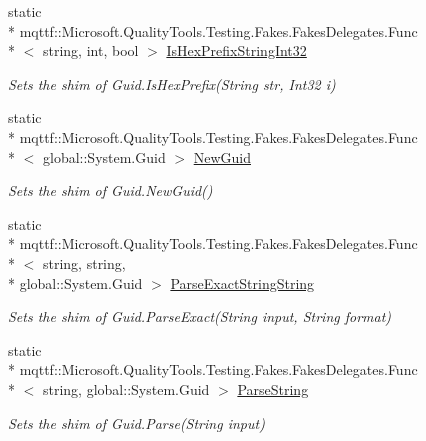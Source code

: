 \begin{DoxyCompactItemize}
static \\*
mqttf\-::\-Microsoft.\-Quality\-Tools.\-Testing.\-Fakes.\-Fakes\-Delegates.\-Func\\*
$<$ string, int, bool $>$ \hyperlink{class_system_1_1_fakes_1_1_shim_guid_af626e6af0ad6ee3ab56830fd79869944}{Is\-Hex\-Prefix\-String\-Int32}
\begin{DoxyCompactList}\small\item\em Sets the shim of Guid.\-Is\-Hex\-Prefix(\-String str, Int32 i)\end{DoxyCompactList}\item 
static \\*
mqttf\-::\-Microsoft.\-Quality\-Tools.\-Testing.\-Fakes.\-Fakes\-Delegates.\-Func\\*
$<$ global\-::\-System.\-Guid $>$ \hyperlink{class_system_1_1_fakes_1_1_shim_guid_aa44e40ba11ad258b623c03fac4a93d38}{New\-Guid}
\begin{DoxyCompactList}\small\item\em Sets the shim of Guid.\-New\-Guid()\end{DoxyCompactList}\item 
static \\*
mqttf\-::\-Microsoft.\-Quality\-Tools.\-Testing.\-Fakes.\-Fakes\-Delegates.\-Func\\*
$<$ string, string, \\*
global\-::\-System.\-Guid $>$ \hyperlink{class_system_1_1_fakes_1_1_shim_guid_a6cdf4b817a4e5678f3476b6ee7a5d12b}{Parse\-Exact\-String\-String}
\begin{DoxyCompactList}\small\item\em Sets the shim of Guid.\-Parse\-Exact(\-String input, String format)\end{DoxyCompactList}\item 
static \\*
mqttf\-::\-Microsoft.\-Quality\-Tools.\-Testing.\-Fakes.\-Fakes\-Delegates.\-Func\\*
$<$ string, global\-::\-System.\-Guid $>$ \hyperlink{class_system_1_1_fakes_1_1_shim_guid_ac2e4b47df4ae2f693bb1d626960bed9a}{Parse\-String}
\begin{DoxyCompactList}\small\item\em Sets the shim of Guid.\-Parse(\-String input)\end{DoxyCompactList}\item 

\end{DoxyCompactItemize}
